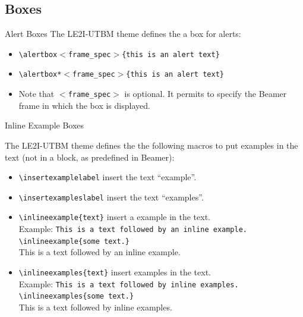 \documentclass[english,sectioncirclenumberstyle]{le2iutbmbeamer}
\begin{document}
\subsection{Boxes}
\tableofcontentslide[sectionstyle={show/shaded},subsectionstyle={show/shaded/hide},subsubsectionstyle={hide/hide/hide/hide},sections={3-}]

\begin{frame}{Alert Boxes}
	The LE2I-UTBM theme defines the a box for alerts: \\
	\begin{itemize}
	\item \texttt{{\textbackslash}alertbox\ensuremath{<}frame\_spec\ensuremath{>}\{this is an alert text\}} \\[.5cm]
		\vspace{1cm}
	\item \texttt{{\textbackslash}alertbox*\ensuremath{<}frame\_spec\ensuremath{>}\{this is an alert text\}} \\[.5cm]
	\item Note that \texttt{\ensuremath{<}frame\_spec\ensuremath{>}} is optional. It permits to specify the Beamer frame in which the box is displayed.
	\end{itemize}
\end{frame}

\begin{frame}{Inline Example Boxes}
	\begin{small}
	The LE2I-UTBM theme defines the the following macros to put examples in the text (not in a block, as predefined in Beamer):
	\begin{itemize}
	\item \texttt{{\textbackslash}insertexamplelabel} insert the text ``example''.
	\item \texttt{{\textbackslash}insertexampleslabel} insert the text ``examples''.
	\vspace{1em}
	\item \texttt{{\textbackslash}inlineexample\{text\}} insert a example in the text. \\
		Example: \texttt{This is a text followed by an inline example. {\textbackslash}inlineexample\{some text.\}} \\
		This is a text followed by an inline example. 
	\item \texttt{{\textbackslash}inlineexamples\{text\}} insert examples in the text. \\
		Example: \texttt{This is a text followed by inline examples. {\textbackslash}inlineexamples\{some text.\}} \\
		This is a text followed by inline examples. 
	\end{itemize}
	\end{small}
\end{frame}
\end{document}
